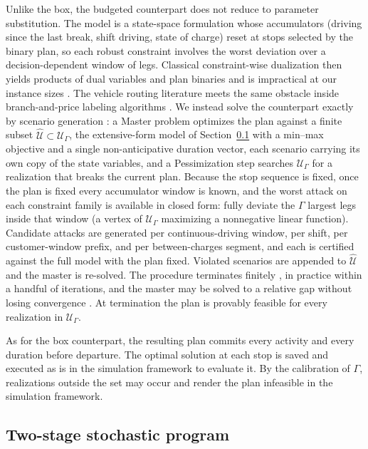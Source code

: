 \documentclass[preprint,12pt,3p]{elsarticle}
\begin{document}
Unlike the box, the budgeted counterpart does not reduce to parameter substitution. The model is a state-space formulation whose accumulators (driving since the last break, shift driving, state of charge) reset at stops selected by the binary plan, so each robust constraint involves the worst deviation over a decision-dependent window of legs. Classical constraint-wise dualization then yields products of dual variables and plan binaries and is impractical at our instance sizes \citep{poss_robust_2013}. The vehicle routing literature meets the same obstacle inside branch-and-price labeling algorithms \citep{munari_robust_2019}.
We instead solve the counterpart exactly by scenario generation \citep{mutapcic_cutting-set_2009, zeng_solving_2013}: a Master problem optimizes the plan against a finite subset $\widehat{\mathcal U} \subset \mathcal U_\Gamma$, the extensive-form model of Section~\ref{sec:sp} with a min--max objective and a single non-anticipative duration vector, each scenario carrying its own copy of the state variables, and a Pessimization step searches $\mathcal U_\Gamma$ for a realization that breaks the current plan. Because the stop sequence is fixed, once the plan is fixed every accumulator window is known, and the worst attack on each constraint family is available in closed form: fully deviate the $\Gamma$ largest legs inside that window (a vertex of $\mathcal U_\Gamma$ maximizing a nonnegative linear function). Candidate attacks are generated per continuous-driving window, per shift, per customer-window prefix, and per between-charges segment, and each is certified against the full model with the plan fixed. Violated scenarios are appended to $\widehat{\mathcal U}$ and the master is re-solved. The procedure terminates finitely \citep{zeng_solving_2013}, in practice within a handful of iterations, and the master may be solved to a relative gap without losing convergence \citep{patzold_approximate_2020}. At termination the plan is provably feasible for every realization in $\mathcal U_\Gamma$.

As for the box counterpart, the resulting plan commits every activity and every duration before departure. The optimal solution at each stop is saved and executed as is in the simulation framework to evaluate it. By the calibration of $\Gamma$, realizations outside the set may occur and render the plan infeasible in the simulation framework.


\subsection{Two-stage stochastic program}
\label{sec:sp}
\end{document}
